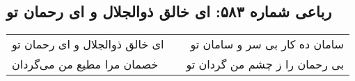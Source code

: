 \begin{center}
\section*{رباعی شماره ۵۸۳: ای خالق ذوالجلال و ای رحمان تو}
\label{sec:sh583}
\begin{longtable}{l p{0.5cm} r}
ای خالق ذوالجلال و ای رحمان تو
&&
سامان ده کار بی سر و سامان تو
\\
خصمان مرا مطیع من می‌گردان
&&
بی رحمان را ز چشم من گردان تو
\\
\end{longtable}
\end{center}
